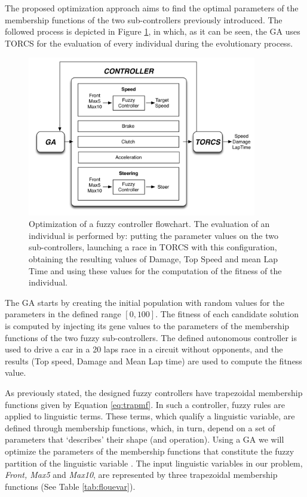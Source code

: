 \documentclass[sigconf]{acmart}
\begin{document}
The proposed optimization approach aims to find the optimal parameters of the membership functions of the two sub-controllers previously introduced. 
The followed process is depicted in Figure \ref{fig:ga}, in which, as it can be seen, the GA uses TORCS for the evaluation of every individual during the evolutionary process.
\begin{figure}[!ht]
  \label{fig:ga}
  \begin{center}
    \includegraphics[width=10cm]{fig/flowchart}
  \end{center}
  \caption{Optimization of a fuzzy controller flowchart. The evaluation of an individual is performed by: putting the parameter values on the two sub-controllers, launching a race in TORCS with this configuration, obtaining the resulting values of Damage, Top Speed and mean Lap Time and using these values for the computation of the fitness of the individual.}
\end{figure}	
The GA starts by creating the initial population with random values
for the parameters in the defined range $[0,100]$. The fitness of each
candidate solution is computed by injecting its gene values to the
parameters of the membership functions of the two fuzzy
sub-controllers. The defined autonomous controller is used to drive a
car in a 20 laps race in a circuit without opponents, and the
results (Top speed, Damage and Mean Lap time) are used to compute the
fitness value. 


As previously stated, the designed fuzzy controllers have trapezoidal membership functions given by Equation \ref{eq:trapmf}.
In such a controller, fuzzy rules are applied to linguistic
terms. These terms, which qualify a linguistic variable, are defined
through membership functions, which, in turn, depend on a set of
parameters that `describes' their shape (and operation). Using a GA we
will optimize the parameters of the membership functions that
constitute the fuzzy partition of the linguistic variable
\cite{ThangG08}. The input linguistic variables in our problem,
\textit{Front, Max5} and \textit{Max10}, are represented by three
trapezoidal membership functions (See Table \ref{tab:flouevar}). %
\end{document}
